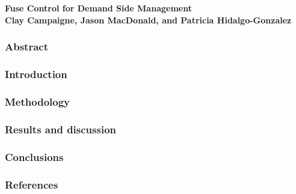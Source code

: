 \documentclass[letter,12pt]{article}
\begin{document}
\part{}
\begin{center}
\small\bf \LARGE Fuse Control for Demand Side Management\\
\smallskip
\small \textnormal{Clay Campaigne, Jason MacDonald, and Patricia Hidalgo-Gonzalez}\\
\end{center}

\bigskip

\section{Abstract}

\section{Introduction}

\section{Methodology}

\section{Results and discussion}

\section{Conclusions}

\section{References}
\end{document}
